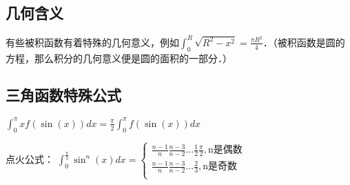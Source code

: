 \subsection{几何含义}
有些被积函数有着特殊的几何意义，例如$\int ^R_0 \sqrt{R^2-x^2}=\frac{\pi R^2}{4}$．（被积函数是圆的方程，那么积分的几何意义便是圆的面积的一部分．）

\subsection{三角函数特殊公式}
$\int ^\pi_0 x f(\sin(x))dx = \frac{\pi}{2}\int ^\pi_0 f(\sin(x))dx$

点火公式：
$
\int ^{\frac{\pi}{2}}_{0} \sin^n(x) dx= 
\left \{
\begin{aligned}
\frac{n-1}{n} \frac{n-3}{n-2}...\frac{1}{2} \frac{\pi}{2},\text{n是偶数}\\
\frac{n-1}{n} \frac{n-3}{n-2}...\frac{2}{3},\text{n是奇数}\\
\end{aligned}
\right.
$
